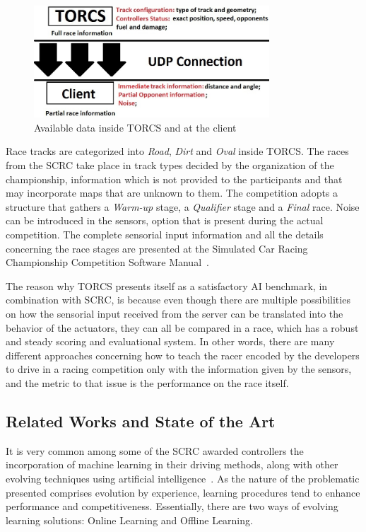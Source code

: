    	\begin{figure}[h]
   		
		\centering
		\includegraphics[width=250pt]{Figure1.jpg}
		\caption{Available data inside TORCS and at the client}
		\label{Fig:Comm}
		
	\end{figure}

	Race tracks are categorized into \emph{Road}, \emph{Dirt} and \emph{Oval} inside TORCS. The races from the SCRC take place in track types decided by the organization of the championship, information which is not provided to the participants and that may incorporate maps that are unknown to them. The competition adopts a structure that gathers a \textit{Warm-up} stage, a \textit{Qualifier} stage and a \textit{Final} race. Noise can be introduced in the sensors, option that is present during the actual competition. The complete sensorial input information and all the details concerning the race stages are presented at the Simulated Car Racing Championship Competition Software Manual~\cite{SCRC}.
	
	The reason why TORCS presents itself as a satisfactory AI benchmark, in combination with SCRC, is because even	though there are multiple possibilities on how the sensorial input received from the server can be translated into the behavior of the actuators, they can all be compared in a race, which has a robust and steady scoring and evaluational system. In other words, there are many different approaches concerning how to teach the racer encoded by the developers to drive in a racing competition only with the information given by the sensors, and the metric to that issue is the performance on the race itself.

\subsection{Related Works and State of the Art} \label{subsec:Related}
	
	It is very common among some of the SCRC awarded controllers the incorporation of machine learning in their driving methods, along with other evolving techniques using artificial intelligence~\cite{2009}. As the nature of the problematic presented comprises evolution by experience, learning procedures tend to enhance performance and competitiveness. Essentially, there are two ways of evolving learning solutions: Online Learning and Offline Learning.

